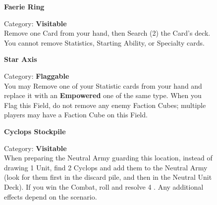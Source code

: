 \begin{figure}[H]
  \begin{minipage}[t]{0.47\textwidth}
    \vspace{0pt}
    \centering
    \phantom{j}\textbf{Faerie Ring}\phantom{j}\par
    \caption{\small Category: \textbf{Visitable}\\
      Remove one Card from your hand, then Search (2) the Card's deck.
      You cannot remove Statistics, Starting Ability, or Specialty cards.}
  \end{minipage}\hfill
  \begin{minipage}[t]{0.47\textwidth}
    \vspace{0pt}
    \centering
    \phantom{j}\textbf{Star Axis}\phantom{j}\par
    \caption{\small Category: \textbf{Flaggable}\\
      You may Remove one of your Statistic cards from your hand and replace it with an \textbf{Empowered} one of the same type.
      When you Flag this Field, do not remove any enemy Faction Cubes; multiple players may have a Faction Cube on this Field.}
  \end{minipage}
\end{figure}

\begin{figure}[H]
  \begin{minipage}[t]{0.47\textwidth}
    \vspace{0pt}
    \centering
    \textbf{Cyclops Stockpile}\par
    \caption{\small Category: \textbf{Visitable}\\
      When preparing the Neutral Army guarding this location, instead of drawing 1  Unit, find 2  Cyclops and add them to the Neutral Army (look for them first in the  discard pile, and then in the  Neutral Unit Deck).
      If you win the Combat, roll and resolve 4 .
      Any additional effects depend on the scenario.
    }
  \end{minipage}\hfill
  \begin{minipage}[t]{0.47\textwidth}
    \vspace{0pt}
    \centering
  \end{minipage}
\end{figure}


